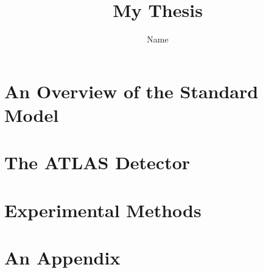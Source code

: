 \documentclass[thesis,openany]{./tex/thesis-umich}
\title{My Thesis}
\author{Name}
\begin{document}

\chapter{An Overview of the Standard Model} \label{chap:theory_chapter}
	 

\chapter{The ATLAS Detector} \label{chap:detector_chapter}
	 

\chapter{Experimental Methods} \label{chap:methods_chapter}
	 


\appendix

\chapter{An Appendix} \label{app:example_appendix}
	


 


\end{document}
